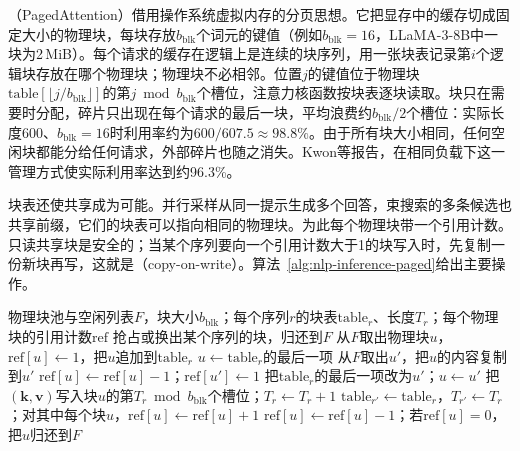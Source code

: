 （PagedAttention）借用操作系统虚拟内存的分页思想。它把显存中的缓存切成固定大小的物理块，每块存放$b_{\mathrm{blk}}$个词元的键值（例如$b_{\mathrm{blk}}=16$，LLaMA-3-8B中一块为2\,MiB）。每个请求的缓存在逻辑上是连续的块序列，用一张块表记录第$i$个逻辑块存放在哪个物理块；物理块不必相邻。位置$j$的键值位于物理块$\mathrm{table}[\lfloor j/b_{\mathrm{blk}}\rfloor]$的第$j\bmod b_{\mathrm{blk}}$个槽位，注意力核函数按块表逐块读取。块只在需要时分配，碎片只出现在每个请求的最后一块，平均浪费约$b_{\mathrm{blk}}/2$个槽位：实际长度600、$b_{\mathrm{blk}}=16$时利用率约为$600/607.5\approx98.8\%$。由于所有块大小相同，任何空闲块都能分给任何请求，外部碎片也随之消失。Kwon等报告，在相同负载下这一管理方式使实际利用率达到约96.3\%。

块表还使共享成为可能。并行采样从同一提示生成多个回答，束搜索的多条候选也共享前缀，它们的块表可以指向相同的物理块。为此每个物理块带一个引用计数。只读共享块是安全的；当某个序列要向一个引用计数大于1的块写入时，先复制一份新块再写，这就是（copy-on-write）。算法~\ref{alg:nlp-inference-paged}给出主要操作。

\begin{algorithm}
  \label{alg:nlp-inference-paged}
  \begin{algorithmic}[1]
    \Require 物理块池与空闲列表$F$，块大小$b_{\mathrm{blk}}$；每个序列$r$的块表$\mathrm{table}_r$、长度$T_r$；每个物理块的引用计数$\mathrm{ref}$
          \State 抢占或换出某个序列的块，归还到$F$
        \EndIf
        \State 从$F$取出物理块$u$，$\mathrm{ref}[u]\gets1$，把$u$追加到$\mathrm{table}_r$
      \Else
        \State $u\gets\mathrm{table}_r$的最后一项
          \State 从$F$取出$u'$，把$u$的内容复制到$u'$
          \State $\mathrm{ref}[u]\gets\mathrm{ref}[u]-1$；$\mathrm{ref}[u']\gets1$
          \State 把$\mathrm{table}_r$的最后一项改为$u'$；$u\gets u'$
        \EndIf
      \EndIf
      \State 把$(\bm k,\bm v)$写入块$u$的第$T_r\bmod b_{\mathrm{blk}}$个槽位；$T_r\gets T_r+1$
    \EndProcedure
      \State $\mathrm{table}_{r'}\gets\mathrm{table}_r$，$T_{r'}\gets T_r$；对其中每个块$u$，$\mathrm{ref}[u]\gets\mathrm{ref}[u]+1$
    \EndProcedure
        \State $\mathrm{ref}[u]\gets\mathrm{ref}[u]-1$；若$\mathrm{ref}[u]=0$，把$u$归还到$F$
      \EndFor
    \EndProcedure
  \end{algorithmic}
\end{algorithm}

